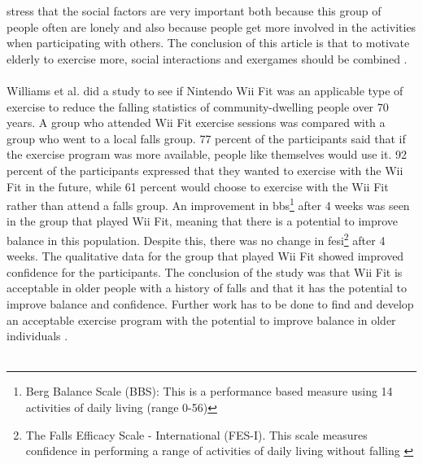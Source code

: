 stress that the social factors are very important both because this group of people often are lonely and also because people get more involved in the activities when participating with others. The conclusion of this article is that to motivate elderly to exercise more, social interactions and exergames should be combined \cite{exergamesforelderly}. \\ \\
Williams et al. \cite{excell} did a study to see if Nintendo Wii Fit was an applicable type of exercise to reduce the falling statistics of community-dwelling people over 70 years. A group who attended Wii Fit exercise sessions was compared with a group who went to a local falls group. 77 percent of the participants said that if the exercise program was more available, people like themselves would use it. 92 percent of the participants expressed that they wanted to exercise with the Wii Fit in the future, while 61 percent would choose to exercise with the Wii Fit rather than attend a falls group. An improvement in \ac{bbs}\footnote{Berg Balance Scale (BBS): This is a performance based measure using 14 activities of daily living (range 0-56)\cite{excell}} after 4 weeks was seen in the group that played Wii Fit, meaning that there is a potential to improve balance in this population. Despite this, there was no change in \ac{fesi}\footnote{The Falls Efficacy Scale - International (FES-I). This scale measures confidence in performing a range of activities of daily living without falling \cite{fes}} after 4 weeks. The qualitative data for the group that played Wii Fit showed improved confidence for the participants. The conclusion of the study was that Wii Fit is acceptable in  older people with a history of falls and that it has the potential to improve balance and confidence. Further work has to be done to find and develop an acceptable exercise program with the potential to improve balance in older individuals \cite{excell}.\\ \\
